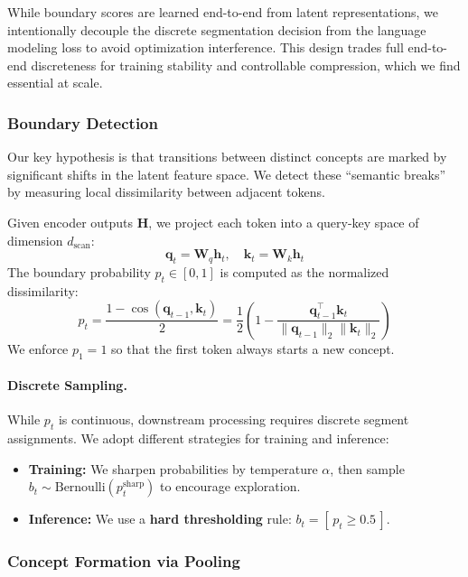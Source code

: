 While boundary scores are learned end-to-end from latent representations, we intentionally decouple the discrete segmentation decision from the language modeling loss to avoid optimization interference.
This design trades full end-to-end discreteness for training stability and controllable compression, which we find essential at scale.

\subsubsection{Boundary Detection}

Our key hypothesis is that transitions between distinct concepts are marked by significant shifts in the latent feature space. We detect these ``semantic breaks'' by measuring local dissimilarity between adjacent tokens.

Given encoder outputs $\mathbf{H}$, we project each token into a query-key space of dimension $d_{\text{scan}}$:
\begin{equation}
    \mathbf{q}_t = \mathbf{W}_q \mathbf{h}_t, \quad \mathbf{k}_t = \mathbf{W}_k \mathbf{h}_t
\end{equation}
The boundary probability $p_t \in [0,1]$ is computed as the normalized dissimilarity:
\begin{equation}
    p_t = \frac{1 - \cos(\mathbf{q}_{t-1}, \mathbf{k}_t)}{2} = \frac{1}{2} \left( 1 - \frac{\mathbf{q}_{t-1}^{\top}\mathbf{k}_t}{\|\mathbf{q}_{t-1}\|_2 \|\mathbf{k}_t\|_2} \right)
    \label{eq:boundary}
\end{equation}
We enforce $p_1 = 1$ so that the first token always starts a new concept.

\paragraph{Discrete Sampling.}
While $p_t$ is continuous, downstream processing requires discrete segment assignments. We adopt different strategies for training and inference:
\begin{itemize}
    \item \textbf{Training:} We sharpen probabilities by temperature $\alpha$, then sample $b_t \sim \text{Bernoulli}(p_t^{\text{sharp}})$ to encourage exploration.
    \item \textbf{Inference:} We use a \textbf{hard thresholding} rule: $b_t = [\, p_t \ge 0.5 \,]$.
\end{itemize}

\subsubsection{Concept Formation via Pooling}

